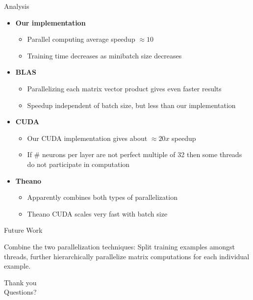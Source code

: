  
\begin{frame}{Analysis}
 	\begin{itemize}
 	\item \textbf{Our implementation}
 	\begin{itemize}
 	\item Parallel computing average speedup $\approx 10$
 	\item Training time decreases as minibatch size decreases
 	\end{itemize}
 	\item \textbf{BLAS}
 	\begin{itemize}
 	\item Parallelizing each matrix vector product gives even faster results
 	\item Speedup independent of batch size, but less than our implementation
	\end{itemize}
	\item \textbf{CUDA}
	\begin{itemize}
	\item Our CUDA implementation gives about $\approx 20x$ speedup
	\item If \# neurons per layer are not perfect multiple of 32 then some threads do not participate in computation
	\end{itemize}
	\item \textbf{Theano}
	\begin{itemize}
	\item Apparently combines both types of parallelization
	\item Theano CUDA scales very fast with batch size
	\end{itemize}
 	\end{itemize}
 
\end{frame}
 
\begin{frame}{Future Work}

Combine the two parallelization techniques:
Split training examples amongst threads, further hierarchically parallelize matrix computations for each individual example.

\end{frame}

\begin{frame}{}

\begin{center}
Thank you \\
\vspace{25pt}
Questions?
\end{center}

\end{frame}




